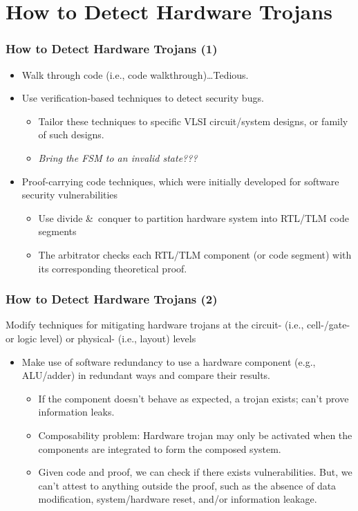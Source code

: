 \documentclass[xcolor={usenames,dvipsnames},hyperref={hyperindex,bookmarks}]{beamer}
\begin{document}
\section{How to Detect Hardware Trojans}

\frame
{
	\frametitle{How to Detect Hardware Trojans (1)}

	\begin{itemize}
	\item Walk through code (i.e., code walkthrough)\dots Tedious.
	\item Use verification-based techniques to detect security bugs.
		\begin{itemize}
		\item Tailor these techniques to specific VLSI circuit/system designs, or family of such designs.
		\item {\it Bring the FSM to an invalid state???}
		\end{itemize}
	\item Proof-carrying code techniques, which were initially developed for software security vulnerabilities
		\begin{itemize}
		\item Use divide \&\ conquer to partition hardware system into RTL/TLM code segments
		\item The arbitrator checks each RTL/TLM component (or code segment) with its corresponding theoretical proof.
		\end{itemize}
	\end{itemize}
}




\frame
{
	\frametitle{How to Detect Hardware Trojans (2)}

	Modify techniques for mitigating hardware trojans at the circuit- (i.e., cell-/gate- or logic level) or physical- (i.e., layout) levels \begin{itemize}
	\item Make use of software redundancy to use a hardware component (e.g., ALU/adder) in redundant ways and compare their results.
		\begin{itemize}
		\item If the component doesn't behave as expected, a trojan exists; can't prove information leaks.
		\item Composability problem: Hardware trojan may only be activated when the components are integrated to form the composed system.
		\item Given code and proof, we can check if there exists vulnerabilities. But, we can't attest to anything outside the proof, such as the absence of data modification, system/hardware reset, and/or information leakage.
		\end{itemize}
	\end{itemize}
}
\end{document}
